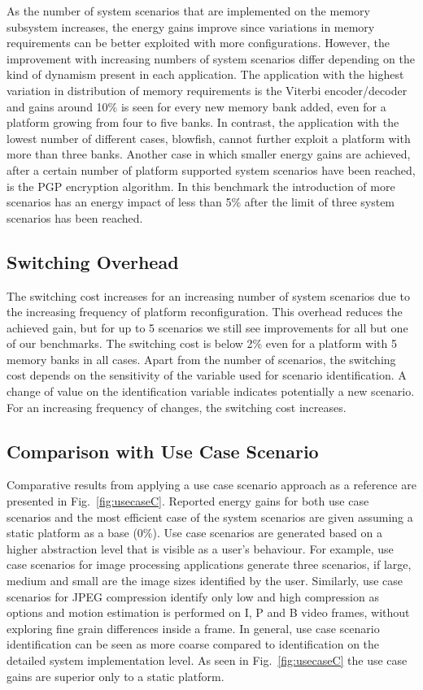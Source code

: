 As the number of system scenarios that are implemented on the memory subsystem increases, the energy gains improve since variations in memory requirements can be better exploited with more configurations. 
However, the improvement with increasing numbers of system scenarios differ depending on the kind of dynamism present in each application. 
The application with the highest variation in distribution of memory requirements is the Viterbi encoder/decoder and gains around 10\% is seen for every new memory bank added, even for a platform growing from four to five banks. 
In contrast, the application with the lowest number of different cases, blowfish, cannot further exploit a platform with more than three banks. 
Another case in which smaller energy gains are achieved, after a certain number of platform supported system scenarios have been reached, is the PGP encryption algorithm. 
In this benchmark the introduction of more scenarios has an energy impact of less than 5\% after the limit of three system scenarios has been reached. 

\subsection{Switching Overhead}

The switching cost increases for an increasing number of system scenarios due to the increasing frequency of platform reconfiguration. 
This overhead reduces the achieved gain, but for up to 5 scenarios we still see improvements for all but one of our benchmarks. 
The switching cost is below 2\% even for a platform with 5 memory banks in all cases.
Apart from the number of scenarios, the switching cost depends on the sensitivity of the variable used for scenario identification. 
A change of value on the identification variable indicates potentially a new scenario. 
For an increasing frequency of changes, the switching cost increases.

\subsection{Comparison with Use Case Scenario}

Comparative results from applying a use case scenario approach as a reference are presented in Fig.~\ref{fig:usecaseC}. 
Reported energy gains for both use case scenarios and the most efficient case of the system scenarios are given assuming a static platform as a base (0\%). 
Use case scenarios are generated based on a higher abstraction level that is visible as a user's behaviour. 
For example, use case scenarios for image processing applications generate three scenarios, if large, medium and small are the image sizes identified by the user. 
Similarly, use case scenarios for JPEG compression identify only low and high compression as options and motion estimation is performed on I, P and B video frames, without exploring fine grain differences inside a frame. 
In general, use case scenario identification can be seen as more coarse compared to identification on the detailed system implementation level. 
As seen in Fig.~\ref{fig:usecaseC} the use case gains are superior only to a static platform.

